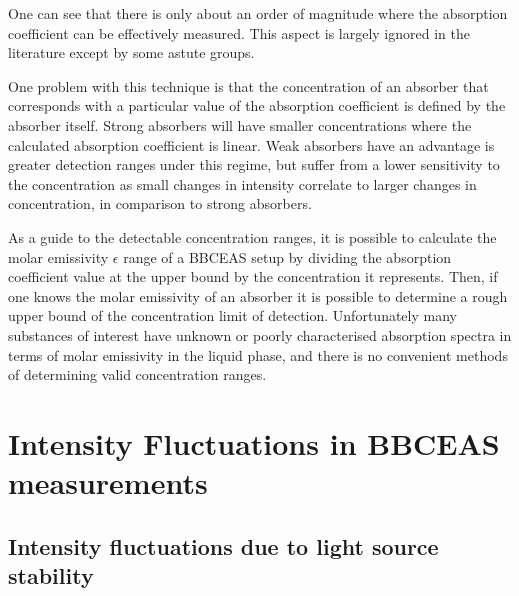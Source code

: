 One can see that there is only about an order of magnitude where the
absorption coefficient can be effectively measured. This aspect is largely
ignored in the literature except by some astute groups.

One problem with this technique is that the concentration of an absorber that
corresponds with a particular value of the absorption coefficient is defined
by the absorber itself. Strong absorbers will have smaller concentrations
where the calculated absorption coefficient is linear. Weak absorbers have an
advantage is greater detection ranges under this regime, but suffer from a
lower sensitivity to the concentration as small changes in intensity correlate
to larger changes in concentration, in comparison to strong absorbers.

As a guide to the detectable concentration ranges, it is possible to calculate
the molar emissivity $\epsilon$ range of a \ac{BBCEAS} setup by dividing
the absorption coefficient value at the upper bound by the concentration
it represents.  Then, if one knows the molar emissivity of an absorber it
is possible to determine a rough upper bound of the concentration limit of
detection. Unfortunately many substances of interest have unknown or poorly
characterised absorption spectra in terms of molar emissivity in the liquid
phase, and there is no convenient methods of determining valid concentration
ranges.

\section{Intensity Fluctuations in BBCEAS measurements}\label{sec:laser_fluc}

\subsection{Intensity fluctuations due to light source stability}

